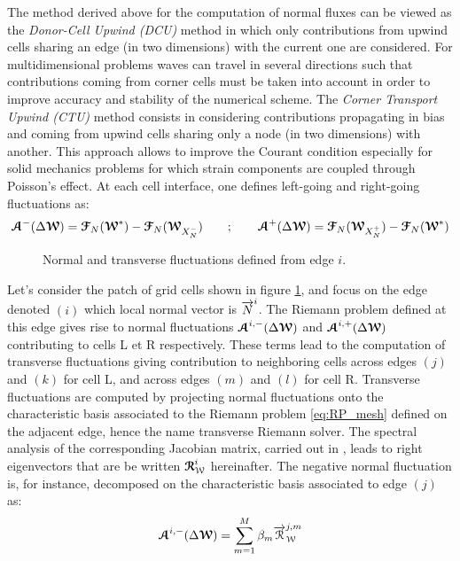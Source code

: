 The method derived above for the computation of normal fluxes can be viewed as the \textit{Donor-Cell Upwind (DCU)} method \cite{Leveque} in which only contributions from upwind cells sharing an edge (in two dimensions) with the current one are considered. For multidimensional problems waves can travel in several directions such that contributions coming from corner cells must be taken into account in order to improve accuracy and stability of the numerical scheme. The \textit{Corner Transport Upwind (CTU)} method \cite{Colella_CTU} consists in considering contributions propagating in bias and coming from upwind cells sharing only a node (in two dimensions) with another. This approach allows to improve the Courant condition especially for solid mechanics problems for which strain components are coupled through Poisson's effect. At each cell interface, one defines left-going and right-going fluctuations as:
\begin{equation}
  {\boldsymbol{\mathcal{A}}}^-(\Delta {\boldsymbol{\mathcal{W}}}) = {\boldsymbol{\mathcal{F}}}_N({\boldsymbol{\mathcal{W}}}^*) - {\boldsymbol{\mathcal{F}}}_N({\boldsymbol{\mathcal{W}}}_{X_N^-}) \qquad ;  \qquad {\boldsymbol{\mathcal{A}}}^+(\Delta {\boldsymbol{\mathcal{W}}}) = {\boldsymbol{\mathcal{F}}}_N({\boldsymbol{\mathcal{W}}}_{X_N^+})-{\boldsymbol{\mathcal{F}}}_N({\boldsymbol{\mathcal{W}}}^*) 
\end{equation}
\begin{figure}[h!]
  \centering
  
  \caption{Normal and transverse fluctuations defined from edge $i$.}
  \label{fig:CTU}
\end{figure}
Let's consider the patch of grid cells shown in figure \ref{fig:CTU}, and focus on the edge denoted $(i)$ which local normal vector is ${\overrightarrow{N}}^i$. The Riemann problem defined at this edge gives rise to normal fluctuations ${\boldsymbol{\mathcal{A}}}^{i,-}(\Delta {\boldsymbol{\mathcal{W}}})$ and ${\boldsymbol{\mathcal{A}}}^{i,+}(\Delta {\boldsymbol{\mathcal{W}}})$ contributing to cells L et R respectively. These terms lead to the computation of transverse fluctuations giving contribution to neighboring cells across edges $(j)$ and $(k)$ for cell L, and across edges $(m)$ and $(l)$ for cell R. Transverse fluctuations are computed by projecting normal fluctuations onto the characteristic basis associated to the Riemann problem \eqref{eq:RP_mesh} defined on the adjacent edge, hence the name transverse Riemann solver. The spectral analysis of the corresponding Jacobian matrix, carried out in \cite{Kluth}, leads to right eigenvectors that are be written ${\boldsymbol{\mathcal{R}}}_{\mathcal{W}}^i$ hereinafter. The negative normal fluctuation is, for instance, decomposed on the characteristic basis associated to edge $(j)$ as:
\begin{equation}
{\boldsymbol{\mathcal{A}}}^{i,-}(\Delta {\boldsymbol{\mathcal{W}}}) = \sum_{m=1}^{M} \beta_m {\overrightarrow{\mathcal{R}}}^{j,m}_{\mathcal{W}}
\end{equation}
